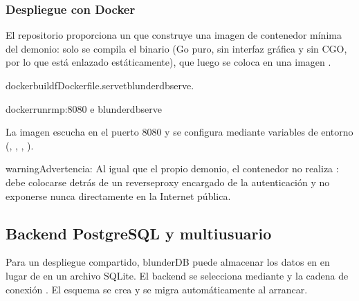 \documentclass[letterpaper,10pt,spanish]{sphinxmanual}
\begin{document}
\subsubsection{Despliegue con Docker}
\label{\detokenize{mode_headless:deploiement-avec-docker}}\label{\detokenize{mode_headless:headless-docker}}
\sphinxAtStartPar
El repositorio proporciona un  que construye una imagen de contenedor mínima del demonio: solo se compila el binario  (Go puro, sin interfaz gráfica y sin CGO, por lo que está enlazado estáticamente), que luego se coloca en una imagen .

\begin{sphinxVerbatim}[commandchars=\\\{\}]
dockerbuild\PYGZhy{}fDockerfile.serve\PYGZhy{}tblunderdb\PYGZhy{}serve.

dockerrun\PYGZhy{}\PYGZhy{}rm\PYGZhy{}p:8080
\PYGZhy{}e
blunderdb\PYGZhy{}serve
\end{sphinxVerbatim}

\sphinxAtStartPar
La imagen escucha en el puerto 8080 y se configura mediante variables de entorno (, , , ).

\begin{sphinxadmonition}{warning}{Advertencia:}
\sphinxAtStartPar
Al igual que el propio demonio, el contenedor no realiza : debe colocarse detrás de un reverse\sphinxhyphen{}proxy encargado de la autenticación y no exponerse nunca directamente en la Internet pública.
\end{sphinxadmonition}


\subsection{Backend PostgreSQL y multiusuario}
\label{\detokenize{mode_headless:backend-postgresql-et-multi-utilisateurs}}\label{\detokenize{mode_headless:headless-postgres}}
\sphinxAtStartPar
Para un despliegue compartido, blunderDB puede almacenar los datos en  en lugar de en un archivo SQLite. El backend se selecciona mediante  y la cadena de conexión . El esquema se crea y se migra automáticamente al arrancar.
\end{document}
